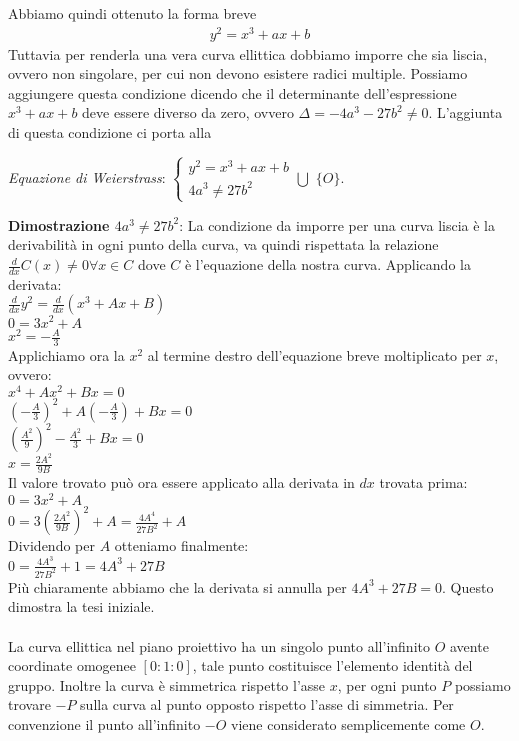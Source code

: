 \documentclass[a4paper,12pt]{tesiinfo}
\begin{document}
Abbiamo quindi ottenuto la forma breve
\begin{gather}
y^2 = x^3 + ax+b
\end{gather}
Tuttavia per renderla una vera curva ellittica dobbiamo imporre che sia liscia, ovvero non singolare, per cui non devono esistere radici multiple. Possiamo aggiungere questa condizione dicendo che il determinante dell'espressione $x^3 + ax+b$ deve essere diverso da zero, ovvero $\Delta = -4a^3 - 27b^2 \ne 0$. L'aggiunta di questa condizione ci porta alla
\begin{center}
\textit{Equazione di Weierstrass}:
$\begin{cases}
y^2 = x^3 + ax+b\\
4a^3 \ne 27b^2\end{cases}
\bigcup $ $\{O\}$.\\
\end{center}
\textbf{Dimostrazione $4a^3 \ne 27b^2$}: La condizione da imporre per una curva liscia \`e la derivabilit\`a in ogni punto della curva, va quindi rispettata la relazione $\frac{d}{dx}C(x) \ne 0 \forall x \in C$ dove $C$ \`e l'equazione della nostra curva. Applicando la derivata:\\
$\frac{d}{dx}y^2 = \frac{d}{dx}(x^3 +Ax+B)$\\
$0 = 3x^2 +A$\\
$x^2 = -\frac{A}{3}$\\
Applichiamo ora la $x^2$ al termine destro dell'equazione breve moltiplicato per $x$, ovvero:\\
$x^4 + Ax^2+Bx = 0$ \\
$(-\frac{A}{3})^2 + A(-\frac{A}{3})+Bx = 0$\\
$(\frac{A^2}{9})^2 - \frac{A^2}{3}+Bx = 0$\\
$x = \frac{2A^2}{9B}$\\
Il valore trovato pu\`o ora essere applicato alla derivata in $dx$ trovata prima:\\
$0 = 3x^2 +A$\\
$0 = 3(\frac{2A^2}{9B})^2 +A = \frac{4A^4}{27B^2} +A $\\
Dividendo per $A$ otteniamo finalmente:\\
$0 = \frac{4A^3}{27B^2} +1 = 4A^3+27B$\\
Pi\`u chiaramente abbiamo che la derivata si annulla per $4A^3+27B = 0$. Questo dimostra la tesi iniziale.\\
\\
La curva ellittica nel piano proiettivo ha un singolo punto all'infinito $O$ avente coordinate omogenee $[0:1:0]$, tale punto costituisce l'elemento identit\`a del gruppo. Inoltre la curva \`e simmetrica rispetto l'asse $x$, per ogni punto $P$ possiamo trovare $-P$ sulla curva al punto opposto rispetto l'asse di simmetria. Per convenzione il punto all'infinito $-O$ viene considerato semplicemente come $O$.\\
\end{document}
